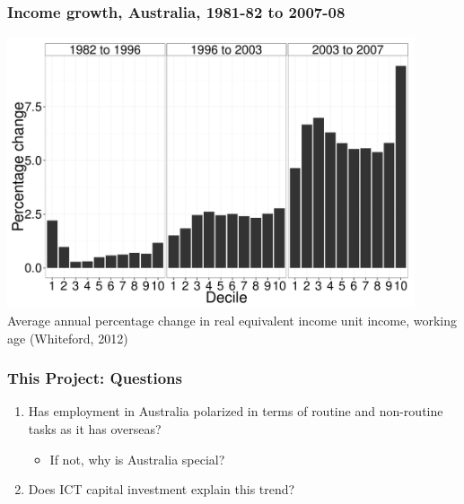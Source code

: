\documentclass[red]{beamer}
\begin{document}
\begin{frame}
  \frametitle{Income growth, Australia, 1981-82 to 2007-08}
  \begin{center}
  \includegraphics[width=0.9\textwidth]{slides/figure_wage_deciles.pdf} \\
  Average annual percentage change in real equivalent income unit income, working age (Whiteford, 2012)
  \end{center}
\end{frame}

\begin{frame}
  \frametitle{This Project: Questions}
  \begin{enumerate}
  \item  Has employment in Australia polarized in terms of routine and non-routine tasks as it has overseas?
    \begin{itemize}
    \item If not, why is Australia special?
    \end{itemize}
    \vspace{1cm}
  \item Does ICT capital investment explain this trend?
  \end{enumerate}
\end{frame}
\end{document}
